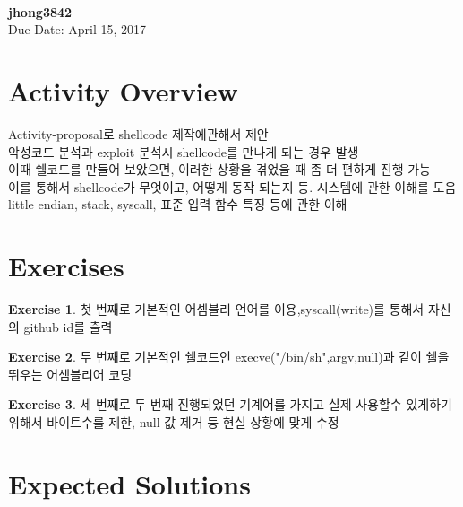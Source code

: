 \documentclass[a4paper, 11pt]{article}
\theoremstyle{definition}
\newtheorem{exercise}{Exercise}
\begin{document}
 \\
         {\phantom{} \hfill \textbf{jhong3842}} \\
         {\phantom{} \hfill Due Date: April 15, 2017} \\

\section{Activity Overview}

Activity-proposal로 shellcode 제작에관해서 제안 \\

악성코드 분석과 exploit 분석시 shellcode를 만나게 되는 경우 발생\\

이때 쉘코드를 만들어 보았으면, 이러한 상황을 겪었을 때 좀 더 편하게 진행 가능\\

이를 통해서 shellcode가 무엇이고, 어떻게 동작 되는지 등. 시스템에 관한 이해를 도음\\

little endian, stack, syscall, 표준 입력 함수 특징 등에 관한 이해

\section{Exercises}

\begin{exercise}

  첫 번째로 기본적인 어셈블리 언어를 이용,syscall(write)를 통해서 자신의 github id를 출력

\end{exercise}

\begin{exercise}

  두 번째로 기본적인 쉘코드인 execve("/bin/sh",argv,null)과 같이 쉘을 뛰우는 어셈블리어 코딩


\end{exercise}

\begin{exercise}

  세 번째로 두 번째 진행되었던 기계어를 가지고 실제 사용할수 있게하기 위해서 바이트수를 제한, null 값 제거 등 현실 상황에 맞게 수정

\end{exercise}

\section{Expected Solutions}
\end{document}

